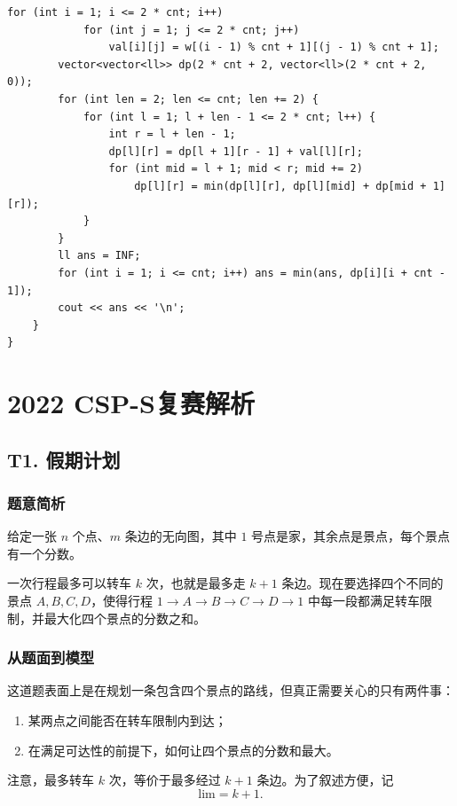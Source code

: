 \documentclass{book}
\begin{document}
\begin{lstlisting}[style = code]
        for (int i = 1; i <= 2 * cnt; i++)
            for (int j = 1; j <= 2 * cnt; j++)
                val[i][j] = w[(i - 1) % cnt + 1][(j - 1) % cnt + 1];
        vector<vector<ll>> dp(2 * cnt + 2, vector<ll>(2 * cnt + 2, 0));
        for (int len = 2; len <= cnt; len += 2) {
            for (int l = 1; l + len - 1 <= 2 * cnt; l++) {
                int r = l + len - 1;
                dp[l][r] = dp[l + 1][r - 1] + val[l][r];
                for (int mid = l + 1; mid < r; mid += 2) 
                    dp[l][r] = min(dp[l][r], dp[l][mid] + dp[mid + 1][r]);
            }
        }
        ll ans = INF;
        for (int i = 1; i <= cnt; i++) ans = min(ans, dp[i][i + cnt - 1]);
        cout << ans << '\n';
    }
}
\end{lstlisting}
\chapter{2022 CSP-S复赛解析}
\newpage

\section{T1. 假期计划}

\subsection{题意简析}

给定一张 $n$ 个点、$m$ 条边的无向图，其中 $1$ 号点是家，其余点是景点，每个景点有一个分数。

一次行程最多可以转车 $k$ 次，也就是最多走 $k+1$ 条边。现在要选择四个不同的景点 $A,B,C,D$，使得行程
$1\to A\to B\to C\to D\to 1$ 中每一段都满足转车限制，并最大化四个景点的分数之和。

\subsection{从题面到模型}

这道题表面上是在规划一条包含四个景点的路线，但真正需要关心的只有两件事：

\begin{enumerate}[leftmargin=2em,itemsep=1pt,topsep=2pt,parsep=0pt,partopsep=0pt]
    \item 某两点之间能否在转车限制内到达；
    \item 在满足可达性的前提下，如何让四个景点的分数和最大。
\end{enumerate}

注意，最多转车 $k$ 次，等价于最多经过 $k+1$ 条边。为了叙述方便，记
\[
\mathrm{lim}=k+1.
\]
\end{document}

